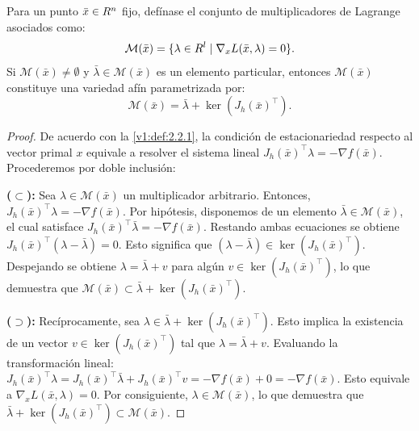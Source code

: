 \begin{proposition}\label{v1:prop:2.2.1}
 Para un punto $\bar{x} \in R^n$ fijo, defínase el conjunto de multiplicadores de Lagrange asociados como:
 \[
 \mathcal{M}(\bar{x}) = \{ \lambda \in R^l \mid \nabla_x L(\bar{x}, \lambda) = 0 \}.
 \]
 Si $\mathcal{M}(\bar{x}) \neq \emptyset$ y $\bar{\lambda} \in \mathcal{M}(\bar{x})$ es un elemento particular, entonces $\mathcal{M}(\bar{x})$ constituye una variedad afín parametrizada por:
 \[
 \mathcal{M}(\bar{x}) = \bar{\lambda} + \ker(J_h(\bar{x})^\top).
 \]
\end{proposition}

\begin{proof}
 De acuerdo con la \cref{v1:def:2.2.1}, la condición de estacionariedad respecto al vector primal $x$ equivale a resolver el sistema lineal $J_h(\bar{x})^\top \lambda = -\nabla f(\bar{x})$. Procederemos por doble inclusión:
 
 \textbf{($\subset$):} Sea $\lambda \in \mathcal{M}(\bar{x})$ un multiplicador arbitrario. Entonces, $J_h(\bar{x})^\top \lambda = -\nabla f(\bar{x})$. Por hipótesis, disponemos de un elemento $\bar{\lambda} \in \mathcal{M}(\bar{x})$, el cual satisface $J_h(\bar{x})^\top \bar{\lambda} = -\nabla f(\bar{x})$. Restando ambas ecuaciones se obtiene $J_h(\bar{x})^\top (\lambda - \bar{\lambda}) = 0$. Esto significa que $(\lambda - \bar{\lambda}) \in \ker(J_h(\bar{x})^\top)$. Despejando se obtiene $\lambda = \bar{\lambda} + v$ para algún $v \in \ker(J_h(\bar{x})^\top)$, lo que demuestra que $\mathcal{M}(\bar{x}) \subset \bar{\lambda} + \ker(J_h(\bar{x})^\top)$.

 \textbf{($\supset$):} Recíprocamente, sea $\lambda \in \bar{\lambda} + \ker(J_h(\bar{x})^\top)$. Esto implica la existencia de un vector $v \in \ker(J_h(\bar{x})^\top)$ tal que $\lambda = \bar{\lambda} + v$. Evaluando la transformación lineal: $J_h(\bar{x})^\top \lambda = J_h(\bar{x})^\top \bar{\lambda} + J_h(\bar{x})^\top v = -\nabla f(\bar{x}) + 0 = -\nabla f(\bar{x})$. Esto equivale a $\nabla_x L(\bar{x}, \lambda) = 0$. Por consiguiente, $\lambda \in \mathcal{M}(\bar{x})$, lo que demuestra que $\bar{\lambda} + \ker(J_h(\bar{x})^\top) \subset \mathcal{M}(\bar{x})$.
\end{proof}

